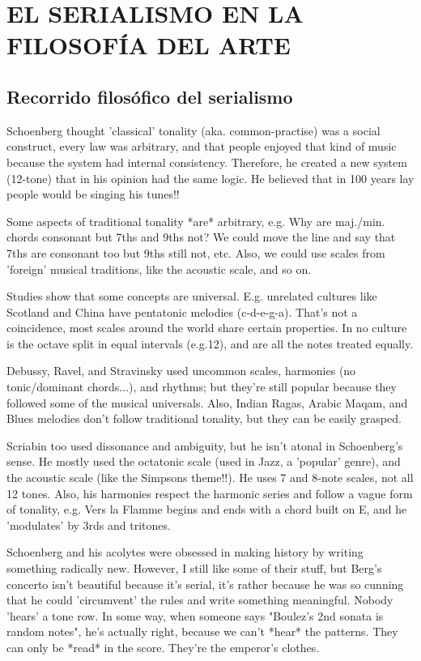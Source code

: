 	\chapter{EL SERIALISMO EN LA FILOSOFÍA DEL ARTE} %
    \section{Recorrido filosófico del serialismo}
    Schoenberg thought 'classical' tonality (aka. common-practise) was a social construct, every law was arbitrary, and that people enjoyed that kind of music because the system had internal consistency. Therefore, he created a new system (12-tone) that in his opinion had the same logic. He believed that in 100 years lay people would be singing his tunes!!
    
    Some aspects of traditional tonality *are* arbitrary, e.g. Why are maj./min. chords consonant but 7ths and 9ths not? We could move the line and say that 7ths are consonant too but 9ths still not, etc. Also, we could use scales from 'foreign' musical traditions, like the acoustic scale, and so on.
    
    Studies show that some concepts are universal. E.g. unrelated cultures like Scotland and China have pentatonic melodies (c-d-e-g-a). That's not a coincidence, most scales around the world share certain properties. In no culture is the octave split in equal intervals (e.g.12), and are all the notes treated equally.
    
    Debussy, Ravel, and Stravinsky used uncommon scales, harmonies (no tonic/dominant chords...), and rhythms; but they're still popular because they followed some of the musical universals. Also, Indian Ragas, Arabic Maqam, and Blues melodies don't follow traditional tonality, but they can be easily grasped.
    
    Scriabin too used dissonance and ambiguity, but he isn't atonal in Schoenberg's sense. He mostly used the octatonic scale (used in Jazz, a 'popular' genre), and the acoustic scale (like the Simpsons theme!!). He uses 7 and 8-note scales, not all 12 tones. Also, his harmonies respect the harmonic series and follow a vague form of tonality, e.g. Vers la Flamme begins and ends with a chord built on E, and he 'modulates' by 3rds and tritones.
    
    Schoenberg and his acolytes were obsessed in making history by writing something radically new. However, I still like some of their stuff, but Berg's concerto isn't beautiful because it's serial, it's rather because he was so cunning that he could 'circumvent' the rules and write something meaningful. Nobody 'hears' a tone row. In some way, when someone says "Boulez's 2nd sonata is random notes", he's actually right, because we can't *hear* the patterns. They can only be *read* in the score. They're the emperor's clothes.
    
